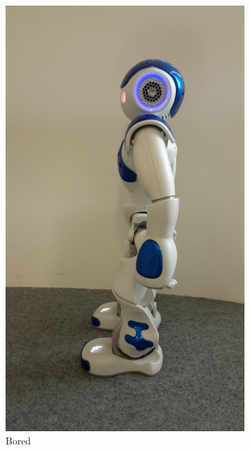 \begin{figure}[h!]
\begin{subfigure}[b]{0.18\textwidth}
                \includegraphics[width=\textwidth]{figures/bored.jpg}
                \caption{Bored}
                \label{fig:bored}
        \end{subfigure}
        ~ %
        \begin{subfigure}[b]{0.18\textwidth}

\end{subfigure}
\end{figure}
